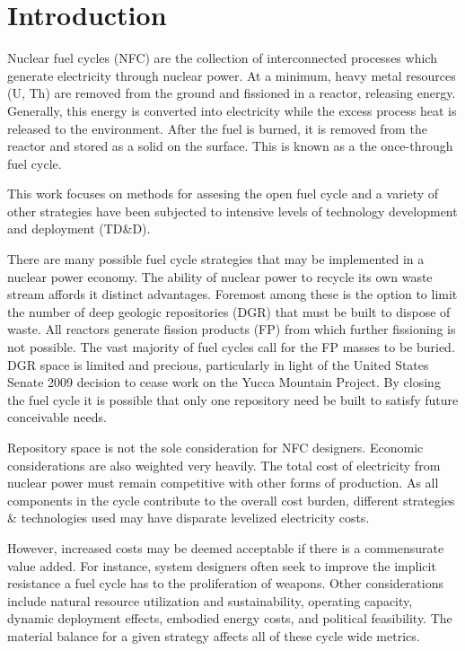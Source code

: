 \chapter{Introduction}
\label{diss_intro}

Nuclear fuel cycles (NFC) are the collection of interconnected processes which 
generate electricity through nuclear power.  
At a minimum, heavy metal resources (U, Th) are removed from the ground
and fissioned in a reactor, releasing energy.  Generally, this energy is converted 
into electricity while the excess process heat is released to the environment.  
After the fuel is burned, it is removed from the reactor and stored as a solid on the surface.
This is known as a the once-through fuel cycle.

This work focuses on methods for assesing the open fuel cycle and a variety of other 
strategies have been subjected to intensive levels of technology development and 
deployment (TD\&D).

There are many possible fuel cycle strategies that may be implemented in a nuclear power economy.
The ability of nuclear power to recycle its own waste stream affords it distinct advantages.  
Foremost among these is the option to limit the number of deep geologic repositories (DGR) 
that must be built to dispose of waste.   All reactors generate fission products (FP) from 
which further fissioning is not possible.  The vast majority of fuel cycles call for the FP masses 
to be buried.  DGR space is limited and precious, particularly in light of the United States Senate 2009
decision to cease work on the Yucca Mountain Project.  
By closing the fuel cycle it is possible  that only one repository need be built to satisfy 
future conceivable needs.

Repository space is not the sole consideration for NFC designers.  Economic considerations 
are also weighted very heavily.  The total cost of electricity from nuclear power must remain competitive 
with other forms of production.  As all components in the cycle contribute to the overall cost burden, 
different strategies \& technologies used may have disparate levelized electricity costs.

However, increased costs may be deemed acceptable if there is a commensurate value added.
For instance, system designers often seek to improve the implicit resistance a fuel cycle 
has to the proliferation of weapons.  Other considerations include natural resource 
utilization and sustainability, operating capacity, dynamic deployment effects,
embodied energy costs, and political feasibility.  The material balance for a given strategy
affects all of these cycle wide metrics.


